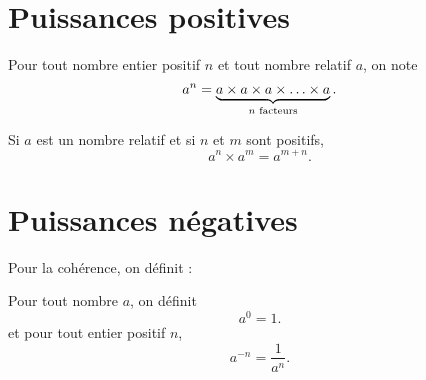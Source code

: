 


\section{Puissances positives}

\begin{definition}
    Pour tout nombre entier positif \( n\) et tout nombre relatif \( a\), on note
    \begin{equation}
        a^n=\underbrace{a\times a \times a\times\ldots\times a}_{\text{\( n\) facteurs}}.
    \end{equation}
\end{definition}


\begin{propriete}
    Si \( a\) est un nombre relatif et si \( n\) et \( m\) sont positifs,
    \begin{equation}
        a^n\times a^m=a^{m+n}.
    \end{equation}
\end{propriete}



\section{Puissances négatives}

Pour la cohérence, on définit :
\begin{definition}
    Pour tout nombre \( a\), on définit
    \begin{equation}
        a^0=1.
    \end{equation}
    et pour tout entier positif \( n\),
    \begin{equation}
        a^{-n}=\frac{1}{ a^n }.
    \end{equation}
\end{definition}

